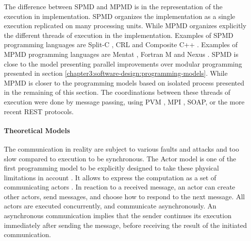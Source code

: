 

The difference between SPMD and MPMD is in the representation of the execution in implementation.
SPMD organizes the implementation as a single execution replicated on many processing units.
While MPMD organizes explicitly the different threads of execution in the implementation.
Examples of SPMD programming languages are
Split-C \cite{Culler},
CRL \cite{Johnson1995} and
Composite C++ \cite{K.ManiChandy2005}.
%
Examples of MPMD programming languages are
Mentat \cite{Grimshaw1991},
Fortran M \cite{Foster1995b} and
Nexus \cite{Foster1996}.
SPMD is close to the model presenting parallel improvements over modular programming presented in section \ref{chapter3:software-design:programming-models}.
While MPMD is closer to the programming models based on isolated process presented in the remaining of this section.
The coordinations between these threads of execution were done by message passing, using PVM \cite{Sunderam1994}, MPI \cite{Snir1996,Walker1996}, SOAP, or the more recent REST protocols.



\paragraph{Theoretical Models}


The communication in reality are subject to various faults and attacks \cite{Lamport1982} and too slow compared to execution to be synchronous.
The Actor model is one of the first programming model to be explicitly designed to take these physical limitations in account \cite{Hewitt1977a}.
It allows to express the computation as a set of communicating actors \cite{Hewitt1973a, Hewitt1977, Clinger1981}.
In reaction to a received message, an actor can create other actors, send messages, and choose how to respond to the next message.
All actors are executed concurrently, and communicate asynchronously.
An asynchronous communication implies that the sender continues its execution immediately after sending the message, before receiving the result of the initiated communication.

